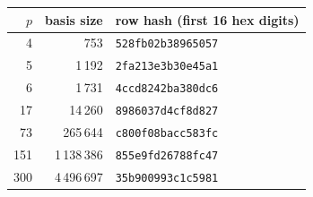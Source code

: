 \begin{tabular}{@{}rrl@{}}
\toprule
$p$ & basis size & row hash (first 16 hex digits)\\
\midrule
4 & 753 & \texttt{528fb02b38965057}\\
5 & 1\,192 & \texttt{2fa213e3b30e45a1}\\
6 & 1\,731 & \texttt{4ccd8242ba380dc6}\\
17 & 14\,260 & \texttt{8986037d4cf8d827}\\
73 & 265\,644 & \texttt{c800f08bacc583fc}\\
151 & 1\,138\,386 & \texttt{855e9fd26788fc47}\\
300 & 4\,496\,697 & \texttt{35b900993c1c5981}\\
\bottomrule
\end{tabular}
